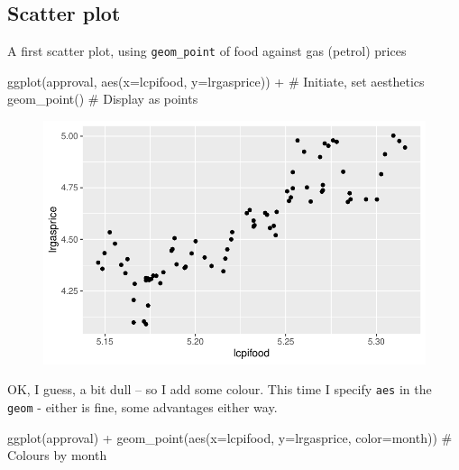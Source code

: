 \documentclass[
  letterpaper,
]{book}
\newenvironment{Shaded}{\begin{snugshade}}{\end{snugshade}}
\newcommand{\AttributeTok}[1]{\textcolor[rgb]{0.40,0.45,0.13}{#1}}
\newcommand{\CommentTok}[1]{\textcolor[rgb]{0.37,0.37,0.37}{#1}}
\newcommand{\FunctionTok}[1]{\textcolor[rgb]{0.28,0.35,0.67}{#1}}
\newcommand{\NormalTok}[1]{\textcolor[rgb]{0.00,0.23,0.31}{#1}}
\newcommand{\SpecialCharTok}[1]{\textcolor[rgb]{0.37,0.37,0.37}{#1}}
\begin{document}
\hypertarget{scatter-plot}{%
\subsection{Scatter plot}\label{scatter-plot}}

A first scatter plot, using \texttt{geom\_point} of food against gas
(petrol) prices

\begin{Shaded}
\begin{Highlighting}[]
\FunctionTok{ggplot}\NormalTok{(approval, }\FunctionTok{aes}\NormalTok{(}\AttributeTok{x=}\NormalTok{lcpifood, }\AttributeTok{y=}\NormalTok{lrgasprice)) }\SpecialCharTok{+}    \CommentTok{\# Initiate, set aesthetics}
  \FunctionTok{geom\_point}\NormalTok{()                                       }\CommentTok{\# Display as points}
\end{Highlighting}
\end{Shaded}

\begin{figure}[H]

{\centering \includegraphics{Appendix1_files/figure-pdf/p1-1.pdf}

}

\end{figure}

OK, I guess, a bit dull -- so I add some colour. This time I specify
\texttt{aes} in the \texttt{geom} - either is fine, some advantages
either way.

\begin{Shaded}
\begin{Highlighting}[]
\FunctionTok{ggplot}\NormalTok{(approval) }\SpecialCharTok{+}
  \FunctionTok{geom\_point}\NormalTok{(}\FunctionTok{aes}\NormalTok{(}\AttributeTok{x=}\NormalTok{lcpifood, }\AttributeTok{y=}\NormalTok{lrgasprice, }\AttributeTok{color=}\NormalTok{month))  }\CommentTok{\# Colours by month}
\end{Highlighting}
\end{Shaded}
\end{document}
